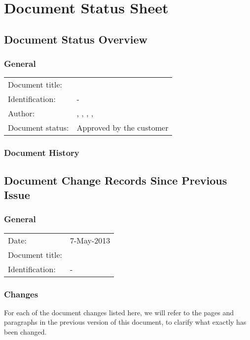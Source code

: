 \chapter*{Document Status Sheet}

\section*{Document Status Overview}
\subsection*{General}
\begin{tabular}[!]{l p{10cm}}
    Document title:     &   \TitleFull{} \\
    Identification:     &   \TitleAbbr{}-\Version{}\\
    Author:             &   \tessa{}, \roel{}, \benjamin{}, \femke{}, \hugo{} \\
    Document status:    &   Approved by the customer\\

\end{tabular}

\subsection*{Document History}

\section*{Document Change Records Since Previous Issue}
\subsection*{General}
\begin{tabular}[!]{ll}
    Date:          &   7-May-2013 \\
    Document title: &   \TitleFull{} \\
    Identification:  &   \TitleAbbr{}-\Version{}\\
\end{tabular}

\subsection*{Changes}
For each of the document changes listed here, we will refer to the pages and paragraphs in the previous version of this document, to clarify what exactly has been changed.


